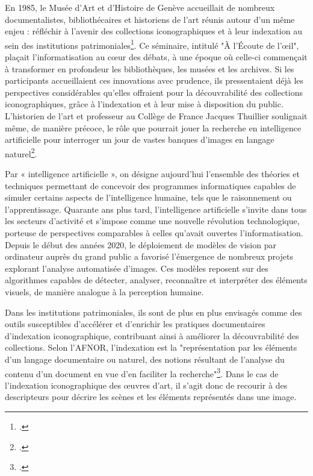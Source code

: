 En 1985, le Musée d’Art et d’Histoire de Genève accueillait de nombreux documentalistes, bibliothécaires et historiens de l’art réunis autour d’un même enjeu : réfléchir à l’avenir des collections iconographiques et à leur indexation au sein des institutions patrimoniales\footcite{rouitLecouteLoeilCollections1989}. Ce séminaire, intitulé "À l’Écoute de l’œil", plaçait l’informatisation au cœur des débats, à une époque où celle-ci commençait à transformer en profondeur les bibliothèques, les musées et les archives. Si les participants accueillaient ces innovations avec prudence, ils pressentaient déjà les perspectives considérables qu’elles offraient pour la découvrabilité des collections iconographiques, grâce à l’indexation et à leur mise à disposition du public. L’historien de l’art et professeur au Collège de France Jacques Thuillier soulignait même, de manière précoce, le rôle que pourrait jouer la recherche en intelligence artificielle pour interroger un jour de vastes banques d’images en langage naturel\footcite[p. 261]{thuillierImageInformatiqueLutilisation1989}.

Par « intelligence artificielle », on désigne aujourd'hui l’ensemble des théories et techniques permettant de concevoir des programmes informatiques capables de simuler certains aspects de l’intelligence humaine, tels que le raisonnement ou l’apprentissage. Quarante ans plus tard, l’intelligence artificielle s’invite dans tous les secteurs d’activité et s’impose comme une nouvelle révolution technologique, porteuse de perspectives comparables à celles qu’avait ouvertes l’informatisation. Depuis le début des années 2020, le déploiement de modèles de vision par ordinateur auprès du grand public a favorisé l’émergence de nombreux projets explorant l’analyse automatisée d’images. Ces modèles reposent sur des algorithmes capables de détecter, analyser, reconnaître et interpréter des éléments visuels, de manière analogue à la perception humaine.

Dans les institutions patrimoniales, ils sont de plus en plus envisagés comme des outils susceptibles d’accélérer et d’enrichir les pratiques documentaires d’indexation iconographique, contribuant ainsi à améliorer la découvrabilité des collections. Selon l’AFNOR, l’indexation est la "représentation par les éléments d'un langage documentaire ou naturel, des notions résultant de l'analyse du contenu d'un document en vue d'en faciliter la recherche"\footcite[vol. 1, p. 292]{associationfrancaisedenormalisationDocumentationRecueilNormes1993}. Dans le cas de l’indexation iconographique des œuvres d’art, il s’agit donc de recourir à des descripteurs pour décrire les scènes et les éléments représentés dans une image.

